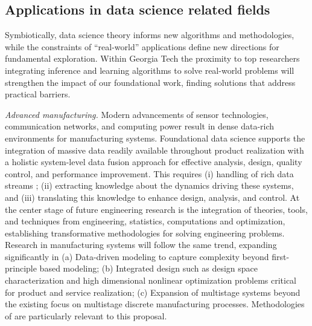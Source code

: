 \documentclass[12pt]{article}
\begin{document}
\vspace*{-1em}
\subsection{Applications in data science related fields}
\label{sec:applications}

Symbiotically, data science theory informs new algorithms and methodologies, while the constraints of ``real-world'' applications  define new directions for fundamental exploration.
Within Georgia Tech the proximity to top researchers integrating inference and learning algorithms to solve real-world problems will  strengthen the impact of our foundational work, finding solutions that address practical barriers.


{\it Advanced manufacturing.}
Modern advancements of sensor technologies, communication networks, and computing power result in dense data-rich environments for manufacturing systems. Foundational data science  supports the integration of massive data readily available throughout product realization with a holistic system-level data fusion approach for effective analysis, design, quality control, and  performance improvement. This requires
 (i)  handling of rich data streams ;
(ii) extracting knowledge about the dynamics driving these systems, and
(iii)  translating this knowledge to enhance design, analysis, and control.
At the center stage of future engineering research is the integration of theories, tools, and techniques from engineering, statistics, computations and optimization, establishing transformative methodologies for solving engineering problems.  Research in manufacturing systems will follow the same trend, expanding significantly in
(a)  Data-driven modeling  to capture complexity beyond first-principle based modeling;
(b)   Integrated design such as design space characterization and high dimensional nonlinear optimization problems critical for product and service realization;
(c) Expansion of  multistage systems beyond the existing focus on multistage discrete manufacturing processes.
Methodologies of  \cite{Shij1,Shij2,Shij3,Shij4,Shij5,Shij6,Shij7,WuHamadaBook2009} are particularly relevant to this proposal.
\end{document}

